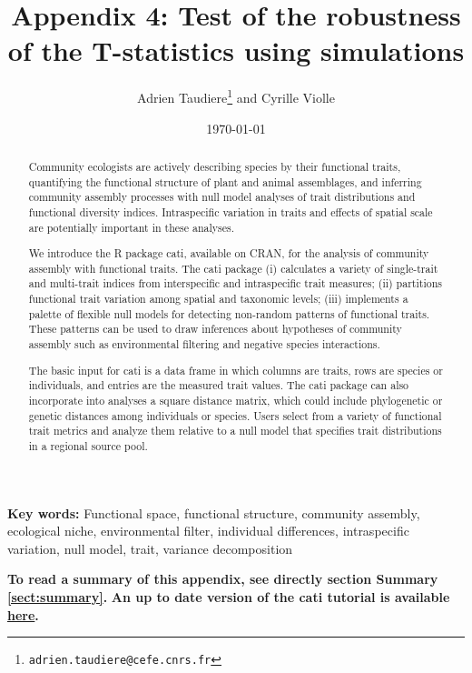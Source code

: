 \documentclass[12pt]{article}\usepackage[]{graphicx}\usepackage[]{color}
\title{Appendix 4: Test of the robustness of the T-statistics using simulations}
\author{Adrien Taudiere\thanks{\texttt{adrien.taudiere@cefe.cnrs.fr}} and Cyrille Violle}
\affil{{\footnotesize CEFE - Centre d'Ecologie Fonctionnelle et Evolutive, Montpellier: France}}
\date{\today}
\begin{document}




\maketitle

\begin{abstract}
  Community ecologists are actively describing species by their functional traits, quantifying the functional structure of plant and animal assemblages, and inferring community assembly processes with null model analyses of trait distributions and functional diversity indices. Intraspecific variation in traits and effects of spatial scale are potentially important in these analyses.
  

	We introduce the R package cati, available on CRAN, for the analysis of community assembly with functional traits. The cati package (i) calculates a variety of single-trait and multi-trait indices from interspecific and intraspecific trait measures; (ii) partitions functional trait variation among spatial and taxonomic levels; (iii) implements a palette of flexible null models for detecting non-random patterns of functional traits. These patterns can be used to draw inferences about hypotheses of community assembly such as environmental filtering and negative species interactions.
  

The basic input for cati is a data frame in which columns are traits, rows are species or individuals, and entries are the measured trait values. The cati package can also incorporate into analyses a square distance matrix, which could include phylogenetic or genetic distances among individuals or species. Users select from a variety of functional trait metrics and analyze them relative to a null model that specifies trait distributions in a regional source pool.
\end{abstract}


\textbf{Key words:}
Functional space, functional structure, community assembly, ecological niche, environmental filter, individual differences, intraspecific variation, null model, trait, variance decomposition


\vfill
\begin{center}
\textbf{To read a summary of this appendix, see directly section Summary \ref{sect:summary}.}
\textbf{An up to date version of the cati tutorial is available \href{https://github.com/adrientaudiere/cati/blob/Package-cati/Documentation/vignette_Darwin_finches/vignette.pdf}{here}.}
\end{center}
\end{document}
